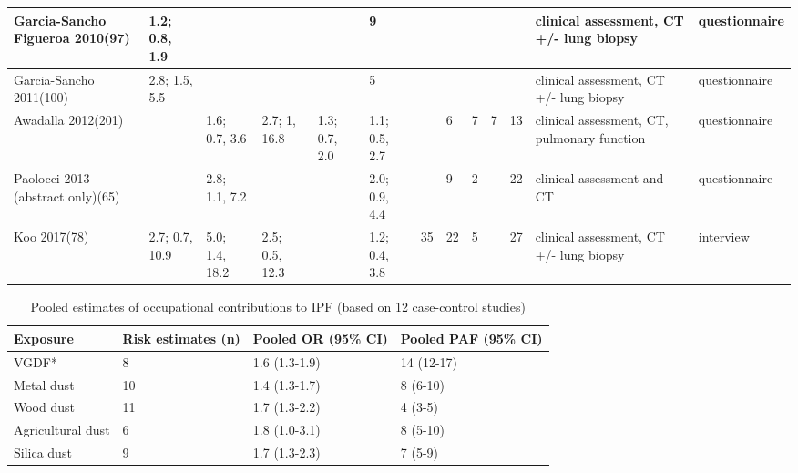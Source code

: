 \documentclass[a4paper,10pt]{article}
\begin{document}
\begin{table}[htbp]
\begin{tabular}{|p{1.5cm}|p{0.5cm}p{0.5cm}p{0.5cm}p{0.5cm}p{0.5cm}|p{0.5cm}p{0.5cm}p{0.5cm}p{0.5cm}p{0.5cm}|p{2.5cm}|p{2cm}|}
\hline
        Garcia-Sancho Figueroa 2010(97)\cite{Garcia-SanchoFigueroa2010}   & 1.2; 0.8, 1.9   &               &               &               & 9  &    &    &    & & & clinical assessment, CT +/- lung biopsy                  & questionnaire                         \\
\hline
        Garcia-Sancho 2011(100)\cite{Garcia-Sancho2011}           & 2.8; 1.5, 5.5   &               &               &               & 5  &    &    &    & & & clinical assessment, CT +/- lung biopsy                  & questionnaire                         \\
\hline
        Awadalla 2012(201)\cite{Awadalla2012}                &               & 1.6; 0.7, 3.6   & 2.7; 1, 16.8    & 1.3; 0.7, 2.0   & 1.1; 0.5, 2.7 &   & 6  & 7  & 7  & 13 & clinical assessment, CT, pulmonary function              & questionnaire                         \\
\hline
        Paolocci 2013 (abstract only)(65)\cite{Paolocci2013} &               & 2.8; 1.1, 7.2   &               &               & 2.0; 0.9, 4.4 &   & 9  & 2  &    & 22 & clinical assessment and CT                               & questionnaire                         \\
\hline
        Koo 2017(78)\cite{Koo2017}                      & 2.7; 0.7, 10.9  & 5.0; 1.4, 18.2  & 2.5; 0.5, 12.3  & & 1.2; 0.4, 3.8              & 35 & 22 & 5  &    & 27 & clinical assessment, CT +/- lung biopsy                  & interview       \\        
\bottomrule             
\end{tabular}
\end{table}

\begin{table}[htbp]\centering
\caption{Pooled estimates of occupational contributions to IPF (based on 12 case-control studies)}
\label{metatable2}
\begin{tabular}{llll}
\toprule
\textbf{Exposure}          & \textbf{Risk estimates (n)} & \textbf{Pooled OR (95\% CI)} & \textbf{Pooled PAF (95\% CI)} \\
\midrule
VGDF*             & 8                  & 1.6 (1.3-1.9)       & 14 (12-17)           \\
Metal dust        & 10                 & 1.4 (1.3-1.7)       & 8 (6-10)             \\
Wood dust         & 11                 & 1.7 (1.3-2.2)       & 4 (3-5)              \\
Agricultural dust & 6                  & 1.8 (1.0-3.1)         & 8 (5-10)             \\
Silica dust       & 9                  & 1.7 (1.3-2.3)       & 7 (5-9)              \\
\bottomrule
\end{tabular}
\end{table}


     
     \makeatletter
      \def\@biblabel#1{#1}
      \makeatother

      
      


      
\end{document}

